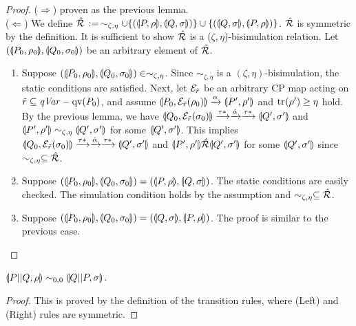 \begin{proof}
 ($\Rightarrow$) proven as the previous lemma.\\
 ($\Leftarrow$) We define $\hat {\mathcal{R}}\,:=\,\sim_{\zeta, \eta}\cup 
\{(\llparenthesis P, \rho \rrparenthesis, \llparenthesis Q, \sigma \rrparenthesis ) \} \cup \{(\llparenthesis Q, \sigma \rrparenthesis,
 \llparenthesis P, \rho \rrparenthesis) \}$. $\hat {\mathcal{R}}$ is symmetric by the definition.
 It is sufficient to show $\hat
 {\mathcal{R}}$ is a ($\zeta, \eta$)-bisimulation relation. Let
 $(\llparenthesis P_0, \rho_0 \rrparenthesis,
 \llparenthesis Q_0, \sigma_0 \rrparenthesis)$
 be an arbitrary element of $\hat {\mathcal{R}}$.
 \begin{enumerate}
  \item  Suppose $(\llparenthesis P_0, \rho_0 \rrparenthesis, \llparenthesis Q_0, \sigma_0 \rrparenthesis) \in
	 \sim_{\zeta, \eta}$. Since $\sim_{\zeta, \eta}$
	 is a $(\zeta, \eta)$-bisimulation, the static
	 conditions are satisfied. Next, let
	 $\mathcal{E}_{\tilde r}$ be an arbitrary CP map acting on 	
	 $\tilde r \subseteq \mathit{qVar} - \mathrm{qv}(P_0)$, and assume
	 $\llparenthesis P_0, \mathcal{E}_{\tilde r}(\rho_0) \rrparenthesis 
	 \xrightarrow{\alpha}
	 \llparenthesis P', \rho' \rrparenthesis$ and ${\rm tr}_{}(\rho') \ge \eta$ hold.
	 By the previous lemma,
	 we have
	 $\llparenthesis Q_0, \mathcal{E}_{\tilde r}(\sigma_0) \rrparenthesis
	 \xrightarrow{\tau*}
	 \xrightarrow{\hat \alpha}
	 \xrightarrow{\tau*} \llparenthesis Q', \sigma' \rrparenthesis$ and
	 $\llparenthesis P', \rho' \rrparenthesis\sim_{\zeta, \eta}
	 \llparenthesis Q', \sigma' \rrparenthesis$
	 for some
	 $\llparenthesis Q', \sigma' \rrparenthesis$.
	 This implies $\llparenthesis Q_0, \mathcal{E}_{\tilde r}(\sigma_0) \rrparenthesis
	 \xrightarrow{\tau*}
	 \xrightarrow{\hat \alpha}
	 \xrightarrow{\tau*} \llparenthesis Q', \sigma' \rrparenthesis$ and
	 $\llparenthesis P', \rho' \rrparenthesis\hat {\mathcal{R}}
	 \llparenthesis Q', \sigma' \rrparenthesis$
	 for some $\llparenthesis Q', \sigma' \rrparenthesis$ since 
	 $\sim_{\zeta, \eta} \subseteq \hat {\mathcal{R}}$.
  \item Suppose $(\llparenthesis P_0, \rho_0 \rrparenthesis,
	\llparenthesis Q_0, \sigma_0 \rrparenthesis) = (\llparenthesis P, \rho \rrparenthesis, \llparenthesis Q, \sigma \rrparenthesis)$.
	The static conditions are easily checked.
	The simulation condition holds by the assumption and
	$\sim_{\zeta, \eta} \subseteq \hat {\mathcal{R}}$.
  \item Suppose $(\llparenthesis P_0, \rho_0 \rrparenthesis,
	\llparenthesis Q_0, \sigma_0 \rrparenthesis) = (\llparenthesis Q, \sigma \rrparenthesis, \llparenthesis P, \rho \rrparenthesis)$.
	The proof is similar to the previous case.
 \end{enumerate}
\end{proof}

\begin{prop}
\label{par:sym-by-par}
 $\llparenthesis P||Q, \rho \rrparenthesis \sim_{0, 0} \llparenthesis Q||P, \sigma \rrparenthesis$.
\end{prop}
\begin{proof}
 This is proved by the definition of the transition rules, where
 (Left) and (Right) rules are symmetric.
\end{proof}


